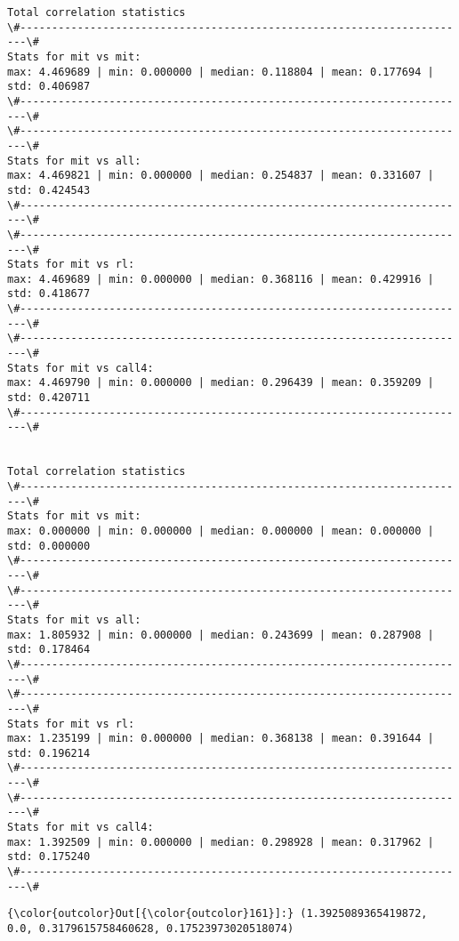 \documentclass[11pt]{article}
\begin{document}
    \begin{Verbatim}[commandchars=\\\{\}]
Total correlation statistics
\#-----------------------------------------------------------------------\#
Stats for mit vs mit: 
max: 4.469689 | min: 0.000000 | median: 0.118804 | mean: 0.177694 | std: 0.406987
\#-----------------------------------------------------------------------\#
\#-----------------------------------------------------------------------\#
Stats for mit vs all: 
max: 4.469821 | min: 0.000000 | median: 0.254837 | mean: 0.331607 | std: 0.424543
\#-----------------------------------------------------------------------\#
\#-----------------------------------------------------------------------\#
Stats for mit vs rl: 
max: 4.469689 | min: 0.000000 | median: 0.368116 | mean: 0.429916 | std: 0.418677
\#-----------------------------------------------------------------------\#
\#-----------------------------------------------------------------------\#
Stats for mit vs call4: 
max: 4.469790 | min: 0.000000 | median: 0.296439 | mean: 0.359209 | std: 0.420711
\#-----------------------------------------------------------------------\#


Total correlation statistics
\#-----------------------------------------------------------------------\#
Stats for mit vs mit: 
max: 0.000000 | min: 0.000000 | median: 0.000000 | mean: 0.000000 | std: 0.000000
\#-----------------------------------------------------------------------\#
\#-----------------------------------------------------------------------\#
Stats for mit vs all: 
max: 1.805932 | min: 0.000000 | median: 0.243699 | mean: 0.287908 | std: 0.178464
\#-----------------------------------------------------------------------\#
\#-----------------------------------------------------------------------\#
Stats for mit vs rl: 
max: 1.235199 | min: 0.000000 | median: 0.368138 | mean: 0.391644 | std: 0.196214
\#-----------------------------------------------------------------------\#
\#-----------------------------------------------------------------------\#
Stats for mit vs call4: 
max: 1.392509 | min: 0.000000 | median: 0.298928 | mean: 0.317962 | std: 0.175240
\#-----------------------------------------------------------------------\#

    \end{Verbatim}

\begin{Verbatim}[commandchars=\\\{\}]
{\color{outcolor}Out[{\color{outcolor}161}]:} (1.3925089365419872, 0.0, 0.3179615758460628, 0.17523973020518074)
\end{Verbatim}
            
\end{document}
